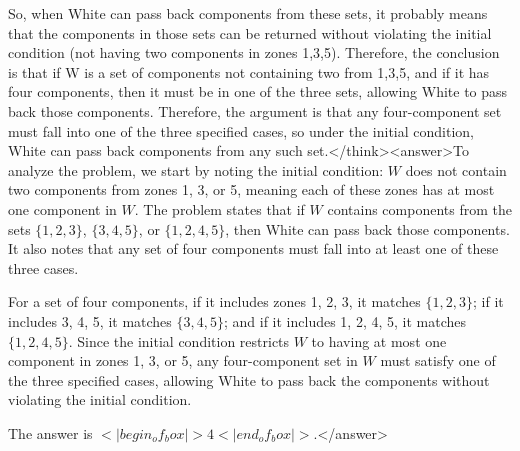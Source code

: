 So, when White can pass back components from these sets, it probably means that the components in those sets can be returned without violating the initial condition (not having two components in zones 1,3,5). Therefore, the conclusion is that if W is a set of components not containing two from 1,3,5, and if it has four components, then it must be in one of the three sets, allowing White to pass back those components. Therefore, the argument is that any four-component set must fall into one of the three specified cases, so under the initial condition, White can pass back components from any such set.</think><answer>To analyze the problem, we start by noting the initial condition: \( W \) does not contain two components from zones 1, 3, or 5, meaning each of these zones has at most one component in \( W \). The problem states that if \( W \) contains components from the sets \(\{1,2,3\}\), \(\{3,4,5\}\), or \(\{1,2,4,5\}\), then White can pass back those components. It also notes that any set of four components must fall into at least one of these three cases.  

For a set of four components, if it includes zones 1, 2, 3, it matches \(\{1,2,3\}\); if it includes 3, 4, 5, it matches \(\{3,4,5\}\); and if it includes 1, 2, 4, 5, it matches \(\{1,2,4,5\}\). Since the initial condition restricts \( W \) to having at most one component in zones 1, 3, or 5, any four-component set in \( W \) must satisfy one of the three specified cases, allowing White to pass back the components without violating the initial condition.  

The answer is \(<|begin_of_box|>4<|end_of_box|>\).</answer>